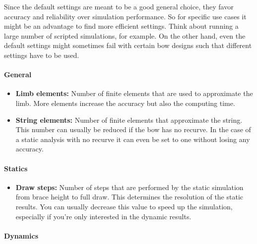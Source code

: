 \documentclass[12pt]{article}
\begin{document}
\newpage

Since the default settings are meant to be a good general choice, they favor accuracy and reliability over simulation performance.
So for specific use cases it might be an advantage to find more efficient settings.
Think about running a large number of scripted simulations, for example.
On the other hand, even the default settings might sometimes fail with certain bow designs such that different settings have to be used.

\paragraph*{General}

\begin{itemize}
\item \textbf{Limb elements:} Number of finite elements that are used to approximate the limb. More elements increase the accuracy but also the computing time.
\item \textbf{String elements:} Number of finite elements that approximate the string. This number can usually be reduced if the bow has no recurve. In the case of a static analysis with no recurve it can even be set to one without losing any accuracy.
\end{itemize}

\paragraph*{Statics}

\begin{itemize}
\item \textbf{Draw steps:} Number of steps that are performed by the static simulation from brace height to full draw. This determines the resolution of the static results. You can usually decrease this value to speed up the simulation, especially if you're only interested in the dynamic results.
\end{itemize}

\paragraph*{Dynamics}
\end{document}
